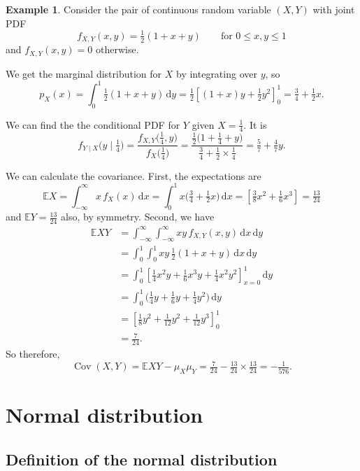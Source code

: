 \documentclass[
  a4paper,
]{book}
\theoremstyle{definition}
\theoremstyle{definition}
\newtheorem{example}{Example}[chapter]
\theoremstyle{definition}
\theoremstyle{definition}
\theoremstyle{remark}
\begin{document}
\begin{example}
Consider the pair of continuous random variable \((X,Y)\) with joint PDF
\[ f_{X,Y}(x,y) = \tfrac12(1 + x + y) \qquad \text{for $0 \leq x,y\leq 1$} \]
and \(f_{X,Y}(x,y) = 0\) otherwise.

We get the marginal distribution for \(X\) by integrating over \(y\), so
\[ p_X(x) = \int_0^1 \tfrac12(1 + x + y) \, \mathrm dy = \tfrac12 \left[(1 + x)y + \tfrac12y^2\right]_0^1 = \tfrac34 + \tfrac12x . \]

We can find the the conditional PDF for \(Y\) given \(X = \tfrac14\). It is
\[ f_{Y\mid X}\big(y \mid \tfrac14\big) = \frac{f_{X,Y}\big(\tfrac14,y\big)}{f_X\big(\tfrac14\big)}
    = \frac{\tfrac12\big(1 + \tfrac14 + y\big)}{\tfrac34 + \tfrac12\times\tfrac14 } = \tfrac{5}{7} + \tfrac47 y . \]

We can calculate the covariance. First, the expectations are
\[ \mathbb EX = \int_{-\infty}^\infty x\, f_X(x) \,\mathrm dx = \int_0^1 x\big(\tfrac34 + \tfrac12x\big)\, \mathrm dx = \left[\tfrac38 x^2 + \tfrac16 x^3 \right] = \tfrac{13}{24} \]
and \(\mathbb EY = \frac{13}{24}\) also, by symmetry. Second, we have
\begin{align*}
\mathbb EXY
&= \int_{-\infty}^\infty \int_{-\infty}^\infty xy\, f_{X,Y}(x,y) \, \mathrm dx\, \mathrm dy \\
&= \int_0^1 \int_0^1 xy \, \tfrac12(1 + x + y)\, \mathrm dx\, \mathrm dy \\
&= \int_0^1 \left[ \tfrac14 x^2y + \tfrac16 x^3y + \tfrac14 x^2y^2  \right]_{x=0}^1 \, \mathrm dy\\
&= \int_0^1 \big( \tfrac14 y + \tfrac16 y + \tfrac14 y^2 \big) \, \mathrm dy\\
&= \left[ \tfrac18 y^2 + \tfrac{1}{12}y^2 + \tfrac{1}{12}y^3  \right]_0^1 \\
&= \tfrac{7}{24} .
\end{align*}
So therefore,
\[ \operatorname{Cov}(X,Y) = \mathbb EXY - \mu_X \mu_Y = \tfrac{7}{24} - \tfrac{13}{24} \times \tfrac{13}{24} = -\tfrac{1}{576} . \]
\end{example}

\hypertarget{S09-normal}{%
\chapter{Normal distribution}\label{S09-normal}}

\hypertarget{normal-definition}{%
\section{Definition of the normal distribution}\label{normal-definition}}
\end{document}
